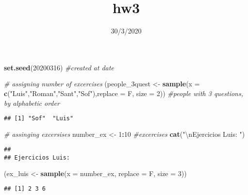 \documentclass[]{article}
\title{hw3}
\author{}
\date{30/3/2020}
\newenvironment{Shaded}{\begin{snugshade}}{\end{snugshade}}
\newcommand{\CharTok}[1]{\textcolor[rgb]{0.31,0.60,0.02}{#1}}
\newcommand{\CommentTok}[1]{\textcolor[rgb]{0.56,0.35,0.01}{\textit{#1}}}
\newcommand{\DataTypeTok}[1]{\textcolor[rgb]{0.13,0.29,0.53}{#1}}
\newcommand{\DecValTok}[1]{\textcolor[rgb]{0.00,0.00,0.81}{#1}}
\newcommand{\KeywordTok}[1]{\textcolor[rgb]{0.13,0.29,0.53}{\textbf{#1}}}
\newcommand{\NormalTok}[1]{#1}
\newcommand{\OperatorTok}[1]{\textcolor[rgb]{0.81,0.36,0.00}{\textbf{#1}}}
\newcommand{\StringTok}[1]{\textcolor[rgb]{0.31,0.60,0.02}{#1}}
\begin{document}
\maketitle

\begin{Shaded}
\begin{Highlighting}[]
\KeywordTok{set.seed}\NormalTok{(}\DecValTok{20200316}\NormalTok{) }\CommentTok{#created at date}

\CommentTok{# assigning number of excercises }
\NormalTok{(people_3quest <-}\StringTok{ }\KeywordTok{sample}\NormalTok{(}\DataTypeTok{x =} \KeywordTok{c}\NormalTok{(}\StringTok{"Luis"}\NormalTok{,}\StringTok{"Roman"}\NormalTok{,}\StringTok{"Sant"}\NormalTok{,}\StringTok{"Sof"}\NormalTok{),}\DataTypeTok{replace =}\NormalTok{ F, }\DataTypeTok{size =} \DecValTok{2}\NormalTok{)) }\CommentTok{#people with 3 questions, by alphabetic order}
\end{Highlighting}
\end{Shaded}

\begin{verbatim}
## [1] "Sof"  "Luis"
\end{verbatim}

\begin{Shaded}
\begin{Highlighting}[]
\CommentTok{# assinging excersises}
\NormalTok{number_ex <-}\StringTok{ }\DecValTok{1}\OperatorTok{:}\DecValTok{10} \CommentTok{#excercises}
\KeywordTok{cat}\NormalTok{(}\StringTok{"}\CharTok{\textbackslash{}n}\StringTok{Ejercicios Luis: "}\NormalTok{)}
\end{Highlighting}
\end{Shaded}

\begin{verbatim}
## 
## Ejercicios Luis:
\end{verbatim}

\begin{Shaded}
\begin{Highlighting}[]
\NormalTok{(ex_luis <-}\StringTok{ }\KeywordTok{sample}\NormalTok{(}\DataTypeTok{x =}\NormalTok{ number_ex, }\DataTypeTok{replace =}\NormalTok{ F, }\DataTypeTok{size =} \DecValTok{3}\NormalTok{))}
\end{Highlighting}
\end{Shaded}

\begin{verbatim}
## [1] 2 3 6
\end{verbatim}

\begin{Shaded}
\end{Shaded}
\end{document}
